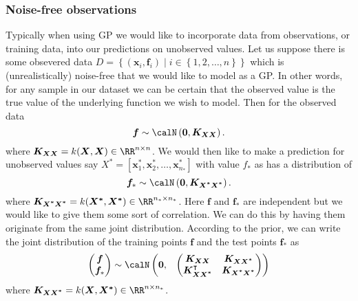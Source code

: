 \subsubsection{Noise-free observations}\label{Section1.1.1}
Typically when using GP we would like to incorporate data from observations, or training data, into our predictions on unobserved values.
Let us suppose there is some obsevered data $D = \left\{ (\bm{x}_i, \bm{f}_i) \mid i \in \left\{ 1,2, \ldots , n \right\} \right\}$ which is (unrealistically) noise-free that we would like to model as a GP. In other words, for any sample in our dataset we can be certain that the observed value is the true value of the underlying function we wish to model. Then for the observed data
\[
	\bm{f} \sim \calN \left( \bm{0}, \bm{K_{XX}} \right).
\]
where $\bm{K_{XX}} = k(\bm{X}, \bm{X}) \in \RR^{n \times n}$. We would then like to make a prediction for unobserved values say $X^{\ast} = \left[ \bm{x}_1^{\ast}, \bm{x}_2^{\ast}, \ldots , \bm{x}_{n_\ast}^{\ast} \right]$ with value $f_{\ast}$ as has a distribution of
\[
	\bm{f}_{\ast} \sim \calN \left( \bm{0}, \bm{K_{X^{\ast}X^{\ast}}} \right).
\]
where $\bm{K_{X^{\ast}X^{\ast}}} = k(\bm{X^{\ast}}, \bm{X^{\ast}}) \in \RR^{n_\ast \times n_\ast}$. Here $\bm{f}$ and $\bm{f}_{\ast}$ are independent but we would like to give them some sort of correlation. We can do this by having them originate from the same joint distribution. According to the prior, we can write the joint distribution of the training points $\bm{f}$ and the test points $\bm{f}_{\ast}$ as
\[
	\begin{pmatrix}
		\bm{f} \\
		\bm{f}_{\ast}
	\end{pmatrix}
	\sim \calN
	\begin{pmatrix}
		\bm{0}, &
		{
				\begin{pmatrix}
					\bm{K_{XX}}                    & \bm{K_{XX^{\ast}}}        \\
					\bm{K_{XX^{\ast}}}^{\intercal} & \bm{K_{X^{\ast}X^{\ast}}}
				\end{pmatrix}
			}
	\end{pmatrix}
\]
where $\bm{K_{XX^{\ast}}} = k(\bm{X}, \bm{X^{\ast}}) \in \RR^{n \times n_\ast}$.

